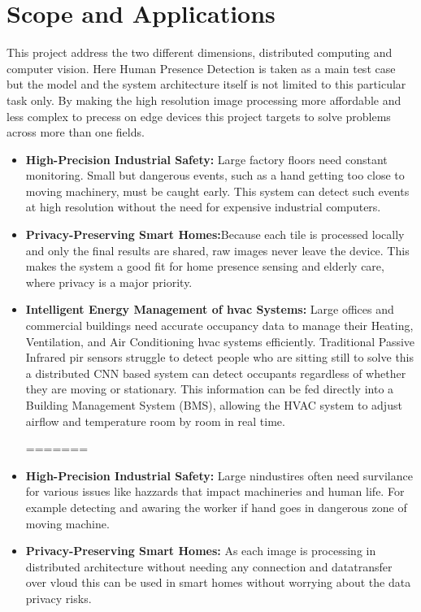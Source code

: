 \section{Scope and Applications}
This project address the two different dimensions, distributed computing and computer vision. Here Human Presence Detection is taken as a main test case but the model and the system architecture itself is not limited to this particular task only. By making the high resolution image processing more affordable and less complex to precess on edge devices this project targets to solve problems across more than one fields. 


\begin{itemize} 
<<<<<<< HEAD
\item \textbf{High-Precision Industrial Safety:} Large factory floors need constant monitoring. Small but dangerous events, such as a hand getting too close to moving machinery, must be caught early. This system can detect such events at high resolution without the need for expensive industrial computers.
\item \textbf{Privacy-Preserving Smart Homes:}Because each tile is processed locally and only the final results are shared, raw images never leave the device. This makes the system a good fit for home presence sensing and elderly care, where privacy is a major priority.
\item \textbf{Intelligent Energy Management of \gls{hvac} Systems:} Large offices and commercial buildings need accurate occupancy data to manage their Heating, Ventilation, and Air Conditioning \gls{hvac} systems efficiently. Traditional Passive Infrared \gls{pir} sensors struggle to detect people who are sitting still to solve this a distributed CNN based system can detect occupants regardless of whether they are moving or stationary. This information can be fed directly into a Building Management System (BMS), allowing the HVAC system to adjust airflow and temperature room by room in real time.

=======
\item \textbf{High-Precision Industrial Safety:} Large nindustires often need survilance for various issues like hazzards that impact machineries and human life. For example detecting and awaring the worker if hand goes in dangerous zone of moving machine.  


\item \textbf{Privacy-Preserving Smart Homes:} As each image is processing in distributed architecture without needing any connection and datatransfer over vloud this can be used in smart homes without worrying about the data privacy risks. 


\end{itemize}
